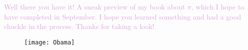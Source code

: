 \documentclass[11pt,titlepage]{article}
\begin{document}
\begin{comment}
There are around $3500$ digits pictured here, and there's actually a feature of $\pi$ that we can see in this illustration that we haven't been able to see yet. It's called the \textbf{Feynman Point}, named after the legendary physicist Richard Feynman. The ``point" is actually a sequence of six $9$s in the digits of $\pi$, which occur starting at the $762$nd spot. It's named after Feynman because he once said that he should memorize the digits of $\pi$ up to that spot, so he could recite them and cleverly finish with ``nine, nine, nine, nine, nine, nine, and so on." See if you can spot it on the spiral picture! First figure out which colour corresponds to the digit nine, then see if you can find six of them in a row. If you can't find them they're circled on the picture atop the next page. 


\begin{figure}
\centering
\texttt{[image: PiArt5]}
\end{figure}

But why should we limit ourselves to only $3500$ points in the spiral? By making the dots super tiny, there's no reason we can't include tens, or even hundreds of thousands of points. Here's what that looks like:

\begin{figure}[h]
\centering
\texttt{[image: PiArt6]}
\caption{Yeah, These Are Really Just Random Pictures Of Colours At This Point}
\end{figure}

The fact that the third of those, which is veering into over $100 000$ digits, looks like a pretty uniform blob, is another indication that $\pi$ is a truly random number. 
\end{comment}


{\Large \textcolor{Plum}{Well there you have it! A sneak preview of my book about $\pi$, which I hope to have completed in September. I hope you learned something and had a good chuckle in the process. Thanks for taking a look!}} 
\vspace{2cm}
\begin{figure}[h]
\centering
\texttt{[image: Obama]}
\end{figure}
\end{document}
